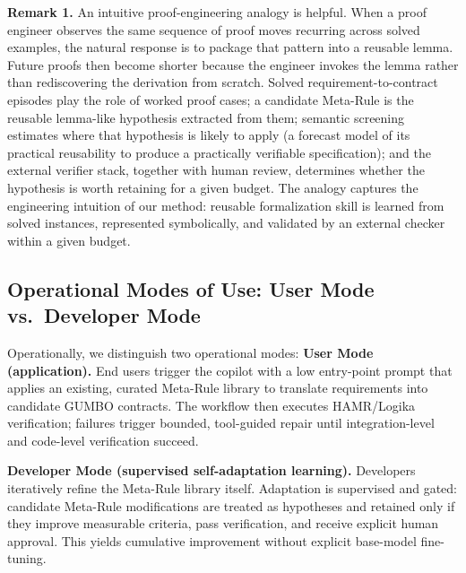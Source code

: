 \documentclass[conference]{IEEEtran}
\begin{document}
\textbf{Remark 1.} An intuitive proof-engineering analogy is helpful. When a proof engineer observes the same sequence of proof moves recurring across solved examples, the natural response is to package that pattern into a reusable lemma. Future proofs then become shorter because the engineer invokes the lemma rather than rediscovering the derivation from scratch.
Solved requirement-to-contract episodes play the role of worked proof cases; a candidate Meta-Rule is the reusable lemma-like hypothesis extracted from them; semantic screening estimates where that hypothesis is likely to apply (a forecast model of its practical reusability to produce a practically verifiable specification); and the external verifier stack, together with human review, determines whether the hypothesis is worth retaining for a given budget. The analogy captures the engineering intuition of our method: reusable formalization skill is learned from solved instances, represented symbolically, and validated by an external checker within a given budget.


\subsection{Operational Modes of Use: User Mode vs.\ Developer Mode}
Operationally, we distinguish two operational modes:
\textbf{User Mode (application).} End users trigger the copilot with a low entry-point prompt that applies an existing, curated Meta-Rule library to translate requirements into candidate GUMBO contracts. The workflow then executes HAMR/Logika verification; failures trigger bounded, tool-guided repair until integration-level and code-level verification succeed.

\textbf{Developer Mode (supervised self-adaptation learning).} Developers iteratively refine the Meta-Rule library itself. Adaptation is supervised and gated: candidate Meta-Rule modifications are treated as hypotheses and retained only if they improve measurable criteria, pass verification, and receive explicit human approval. This yields cumulative improvement without explicit base-model fine-tuning.
\end{document}
